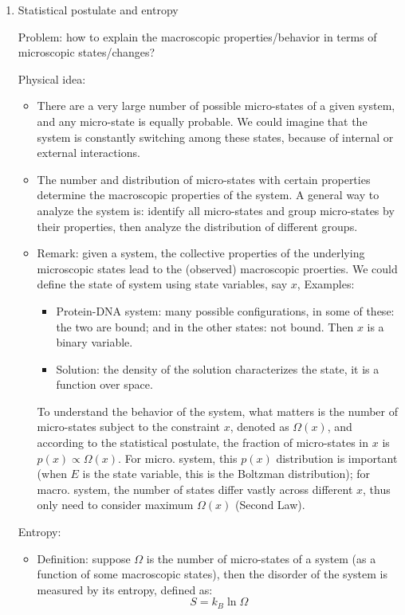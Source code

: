 \documentclass{report}
\begin{document}
\begin{enumerate}

\item{Statistical postulate and entropy}

Problem: how to explain the macroscopic properties/behavior in terms of microscopic states/changes? 

Physical idea: 
\begin{itemize}
\item There are a very large number of possible micro-states of a given system, and any micro-state is equally probable. We could imagine that the system is constantly switching among these states, because of internal or external interactions. 
\item The number and distribution of micro-states with certain properties determine the macroscopic properties of the system. A general way to analyze the system is: identify all micro-states and group micro-states by their properties, then analyze the distribution of different groups. 

\item Remark: given a system, the collective properties of the underlying microscopic states lead to the (observed) macroscopic proerties. We could define the state of system using state variables, say $x$, Examples: 
\begin{itemize}
	\item Protein-DNA system: many possible configurations, in some of these: the two are bound; and in the other states: not bound. Then $x$ is a binary variable.
	\item Solution: the density of the solution characterizes the state, it is a function over space. 
\end{itemize}
To understand the behavior of the system, what matters is the number of micro-states subject to the constraint $x$, denoted as $\Omega(x)$, and according to the statistical postulate, the fraction of micro-states in $x$ is $p(x) \propto \Omega(x)$. For micro. system, this $p(x)$ distribution is important (when $E$ is the state variable, this is the Boltzman distribution); for macro. system, the number of states differ vastly across different $x$, thus only need to consider maximum $\Omega(x)$ (Second Law). 
\end{itemize}

Entropy: 
\begin{itemize}
\item Definition: suppose $\Omega$ is the number of micro-states of a system (as a function of some macroscopic states), then the disorder of the system is measured by its entropy, defined as: 
\begin{equation}
S = k_B \ln\Omega
\end{equation}


\end{itemize}
\end{enumerate}
\end{document}
